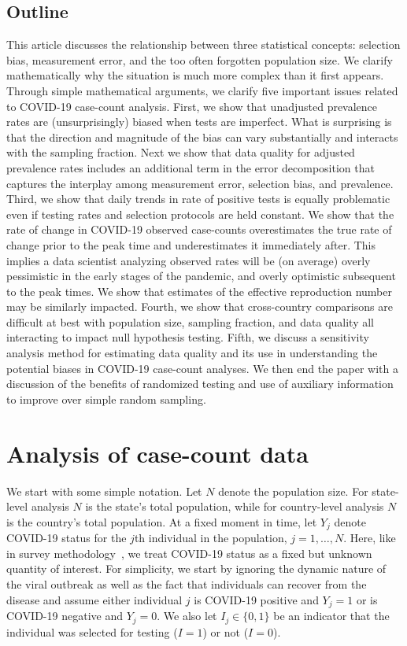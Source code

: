 \documentclass[aoas]{amsart}
\begin{document}

\subsection{Outline}

This article discusses the relationship between three statistical concepts: selection bias, measurement error, and the too often forgotten population size. We clarify mathematically why the situation is much more complex than it first appears.  Through simple mathematical arguments, we clarify five important issues related to COVID-19 case-count analysis.  First, we show that unadjusted prevalence rates are (unsurprisingly) biased when tests are imperfect. What is surprising is that the direction and magnitude of the bias can vary substantially and interacts with the sampling fraction.  Next we show that data quality for adjusted prevalence rates includes an additional term in the error decomposition that captures the interplay among measurement error, selection bias, and prevalence.  Third, we show that daily trends in rate of positive tests is equally problematic even if testing rates and selection protocols are held constant.  We show that the rate of change in COVID-19 observed case-counts overestimates the true rate of change prior to the peak time and underestimates it immediately after.  This implies a data scientist analyzing observed rates will be (on average) overly pessimistic in the early stages of the pandemic, and overly optimistic subsequent to the peak times.  We show that estimates of the effective reproduction number may be similarly impacted.  Fourth, we show that cross-country comparisons are difficult at best with population size, sampling fraction, and data quality all interacting to impact null hypothesis testing.  Fifth, we discuss a sensitivity analysis method for estimating data quality and its use in understanding the potential biases in COVID-19 case-count analyses.  We then end the paper with a discussion of the benefits of randomized testing and use of auxiliary information to improve over simple random sampling.

\section{Analysis of case-count data}
\label{section:casecount}

We start with some simple notation.  Let $N$ denote the population size.  For state-level analysis $N$ is the state's total population, while for country-level analysis $N$ is the country's total population.  At a fixed moment in time, let $Y_j$ denote COVID-19 status for the $j$th individual in the population, $j=1,\ldots, N$. Here, like in survey methodology~\citep{Cochran77}, we treat COVID-19 status as a fixed but unknown quantity of interest. For simplicity, we start by ignoring the dynamic nature of the viral outbreak as well as the fact that individuals can recover from the disease and assume either individual $j$ is COVID-19 positive and $Y_j=1$ or is COVID-19 negative and $Y_j=0$. We also let $I_j \in \{0,1\}$ be an indicator that the individual was selected for testing ($I = 1$) or not ($I=0$).
\end{document}

